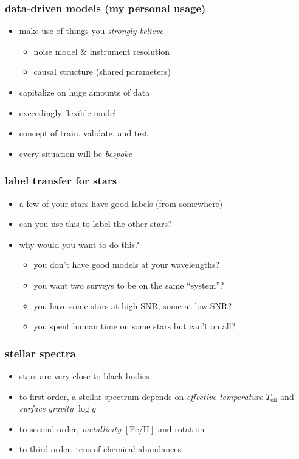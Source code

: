 \documentclass[pdftex]{beamer}
\newcommand{\teff}{T_{\mathrm{eff}}}
\newcommand{\logg}{\log g}
\newcommand{\feh}{[\mathrm{Fe / H}]}
\begin{document}
\begin{frame}
  \frametitle{data-driven models (my personal usage)}
  \begin{itemize}
  \item make use of things you \emph{strongly believe}
    \begin{itemize}
    \item noise model \& instrument resolution
    \item causal structure (shared parameters)
    \end{itemize}
  \item capitalize on huge amounts of data
  \item exceedingly flexible model
  \item concept of train, validate, and test
  \item every situation will be \emph{bespoke}
  \end{itemize}
\end{frame}

\begin{frame}
  \frametitle{label transfer for stars}
  \begin{itemize}
  \item a few of your stars have good labels (from somewhere)
  \item can you use this to label the other stars?
  \item why would you want to do this?
    \begin{itemize}
    \item<2> you don't have good models at your wavelengths?
    \item<2> you want two surveys to be on the same ``system''?
    \item<2> you have some stars at high SNR, some at low SNR?
    \item<2> you spent human time on some stars but can't on all?
    \end{itemize}
  \end{itemize}
\end{frame}

\begin{frame}
  \frametitle{stellar spectra}
  \begin{itemize}
  \item<1-> stars are very close to black-bodies
  \item<1-> to first order, a stellar spectrum depends on \emph{effective temperature} $\teff$ and \emph{surface gravity} $\logg$
  \item<2-> to second order, \emph{metallicity} $\feh$ and rotation
  \item<3> to third order, tens of chemical abundances
  \end{itemize}
\end{frame}
\end{document}
